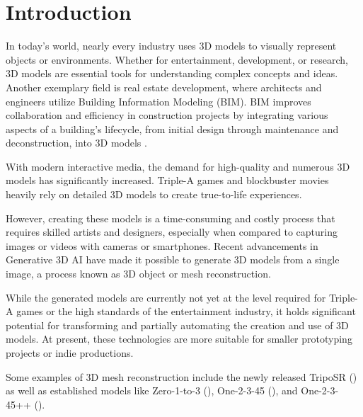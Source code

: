 

\section{Introduction}
\label{section:Introduction}
In today's world, nearly every industry uses 3D models to visually represent objects or environments. Whether for entertainment, development, or research, 3D models are essential tools for understanding complex concepts and ideas.
Another exemplary field is real estate development, where architects and engineers utilize Building Information Modeling (BIM). BIM improves collaboration and efficiency in construction projects by integrating various aspects of a building's lifecycle, from initial design through maintenance and deconstruction, into 3D models \autocite{azhar_building_2020}.


With modern interactive media, the demand for high-quality and numerous 3D models has significantly increased. Triple-A games and blockbuster movies heavily rely on detailed 3D models to create true-to-life experiences.

However, creating these models is a time-consuming and costly process that requires skilled artists and designers, especially when compared to capturing images or videos with cameras or smartphones. Recent advancements in Generative 3D AI have made it possible to generate 3D models from a single image, a process known as 3D object or mesh reconstruction.

While the generated models are currently not yet at the level required for Triple-A games or the high standards of the entertainment industry, it holds significant potential for transforming and partially automating the creation and use of 3D models. At present, these technologies are more suitable for smaller prototyping projects or indie productions.

Some examples of 3D mesh reconstruction include the newly released TripoSR (\textcite{tochilkin_triposr_2024}) as well as established models like Zero-1-to-3 (\textcite{liu_zero-1--3_2023}), One-2-3-45 (\textcite{liu_one-2-3-45_2023}), and One-2-3-45++ (\textcite{liu_one-2-3-45_2023-1}).

